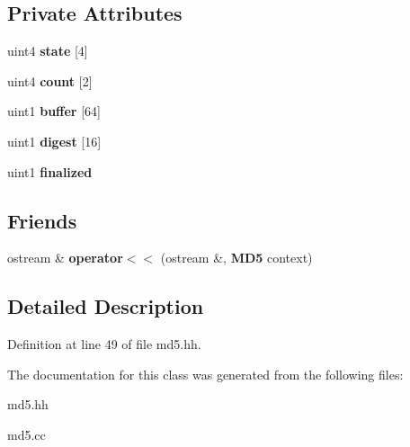 \subsection*{Private Attributes}
\begin{DoxyCompactItemize}
\item 
uint4 {\bfseries state} [4]\label{classMD5_aae3f861952f5b129463f550170836db0}

\item 
uint4 {\bfseries count} [2]\label{classMD5_a52a9ff26a3de9e831b17c1740aa5388a}

\item 
uint1 {\bfseries buffer} [64]\label{classMD5_a2da5cb0336064b6f96de5b69fd4d219d}

\item 
uint1 {\bfseries digest} [16]\label{classMD5_a31058e1dca10bbf29818bb5177ff02ac}

\item 
uint1 {\bfseries finalized}\label{classMD5_a35a2d039cfb8e13a959201667911211d}

\end{DoxyCompactItemize}
\subsection*{Friends}
\begin{DoxyCompactItemize}
\item 
ostream \& {\bfseries operator$<$$<$} (ostream \&, {\bf M\-D5} context)\label{classMD5_a37bb1f259ab8bdfe589f3fc5f07a62d0}

\end{DoxyCompactItemize}


\subsection{Detailed Description}


Definition at line 49 of file md5.\-hh.



The documentation for this class was generated from the following files\-:\begin{DoxyCompactItemize}
\item 
md5.\-hh\item 
md5.\-cc\end{DoxyCompactItemize}
